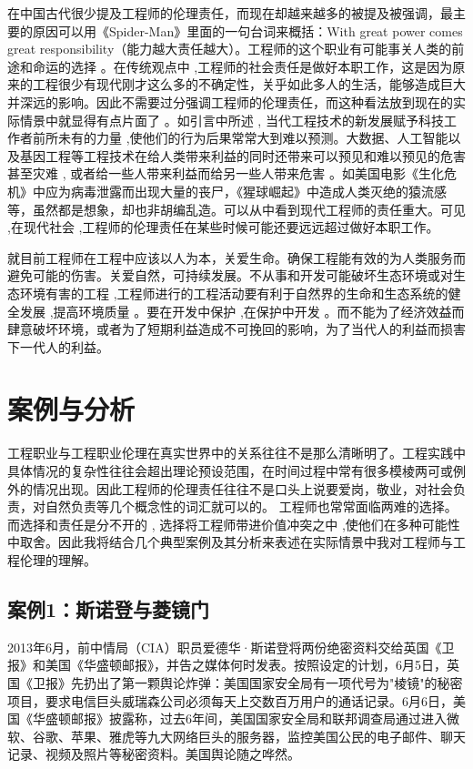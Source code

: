 \documentclass[a4paper,12pt]{ctexart}
\begin{document}
在中国古代很少提及工程师的伦理责任，而现在却越来越多的被提及被强调，最主要的原因可以用《Spider-Man》里面的一句台词来概括：With great power comes great responsibility（能力越大责任越大）。工程师的这个职业有可能事关人类的前途和命运的选择 。在传统观点中 ,工程师的社会责任是做好本职工作，这是因为原来的工程很少有现代刚才这么多的不确定性，关乎如此多人的生活，能够造成巨大并深远的影响。因此不需要过分强调工程师的伦理责任，而这种看法放到现在的实际情景中就显得有点片面了 。如引言中所述 , 当代工程技术的新发展赋予科技工作者前所未有的力量 ,使他们的行为后果常常大到难以预测。大数据、人工智能以及基因工程等工程技术在给人类带来利益的同时还带来可以预见和难以预见的危害甚至灾难 , 或者给一些人带来利益而给另一些人带来危害 。如美国电影《生化危机》中应为病毒泄露而出现大量的丧尸，《猩球崛起》中造成人类灭绝的猿流感等，虽然都是想象，却也非胡编乱造。可以从中看到现代工程师的责任重大。可见 ,在现代社会 ,工程师的伦理责任在某些时候可能还要远远超过做好本职工作。

就目前工程师在工程中应该以人为本，关爱生命。确保工程能有效的为人类服务而避免可能的伤害。关爱自然，可持续发展。不从事和开发可能破坏生态环境或对生态环境有害的工程 ,工程师进行的工程活动要有利于自然界的生命和生态系统的健全发展 ,提高环境质量 。要在开发中保护 ,在保护中开发 。而不能为了经济效益而肆意破坏环境，或者为了短期利益造成不可挽回的影响，为了当代人的利益而损害下一代人的利益。

\section{案例与分析}
工程职业与工程职业伦理在真实世界中的关系往往不是那么清晰明了。工程实践中具体情况的复杂性往往会超出理论预设范围，在时间过程中常有很多模棱两可或例外的情况出现。因此工程师的伦理责任往往不是口头上说要爱岗，敬业，对社会负责，对自然负责等几个概念性的词汇就可以的。
工程师也常常面临两难的选择。而选择和责任是分不开的 , 选择将工程师带进价值冲突之中 ,使他们在多种可能性中取舍。因此我将结合几个典型案例及其分析来表述在实际情景中我对工程师与工程伦理的理解。
\subsection{案例1：斯诺登与菱镜门}
2013年6月，前中情局（CIA）职员爱德华·斯诺登将两份绝密资料交给英国《卫报》和美国《华盛顿邮报》，并告之媒体何时发表。按照设定的计划，6月5日，英国《卫报》先扔出了第一颗舆论炸弹：美国国家安全局有一项代号为"棱镜"的秘密项目，要求电信巨头威瑞森公司必须每天上交数百万用户的通话记录。6月6日，美国《华盛顿邮报》披露称，过去6年间，美国国家安全局和联邦调查局通过进入微软、谷歌、苹果、雅虎等九大网络巨头的服务器，监控美国公民的电子邮件、聊天记录、视频及照片等秘密资料。美国舆论随之哗然。
\end{document}
